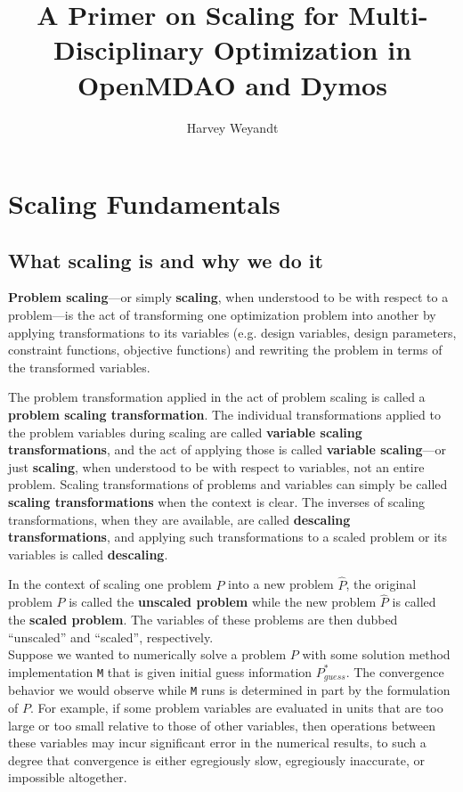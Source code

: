 \documentclass{article}
\title{A Primer on Scaling for Multi-Disciplinary Optimization in OpenMDAO and Dymos}
\author{Harvey Weyandt}
\date{}
\begin{document}
\maketitle

\tableofcontents

\newpage
\section{Scaling Fundamentals}

\subsection*{What scaling is and why we do it}

\textbf{Problem scaling}---or simply \textbf{scaling}, when understood to be with respect to a problem---is the act of transforming one optimization problem into another by applying transformations to its variables (e.g. design variables, design parameters, constraint functions, objective functions) and rewriting the problem in terms of the transformed variables. 

The problem transformation applied in the act of problem scaling is called a \textbf{problem scaling transformation}. The individual transformations applied to the problem variables during scaling are called \textbf{variable scaling transformations}, and the act of applying those is called \textbf{variable scaling}---or just \textbf{scaling}, when understood to be with respect to variables, not an entire problem. Scaling transformations of problems and variables can simply be called \textbf{scaling transformations} when the context is clear. The inverses of scaling transformations, when they are available, are called \textbf{descaling transformations}, and applying such transformations to a scaled problem or its variables is called \textbf{descaling}.

In the context of scaling one problem $P$ into a new problem $\hat{P}$, the original problem $P$ is called the \textbf{unscaled problem} while the new problem $\hat{P}$ is called the \textbf{scaled problem}. The variables of these problems are then dubbed ``unscaled'' and ``scaled'', respectively.
\\

\noindent
Suppose we wanted to numerically solve a problem $P$ with some solution method implementation \texttt{M} that is given initial guess information $P_{guess}^*$. The convergence behavior we would observe while \texttt{M} runs is determined in part by the formulation of $P$. For example, if some problem variables are evaluated in units that are too large or too small relative to those of other variables, then operations between these variables may incur significant error in the numerical results, to such a degree that convergence is either egregiously slow, egregiously inaccurate, or impossible altogether. 
\end{document}
